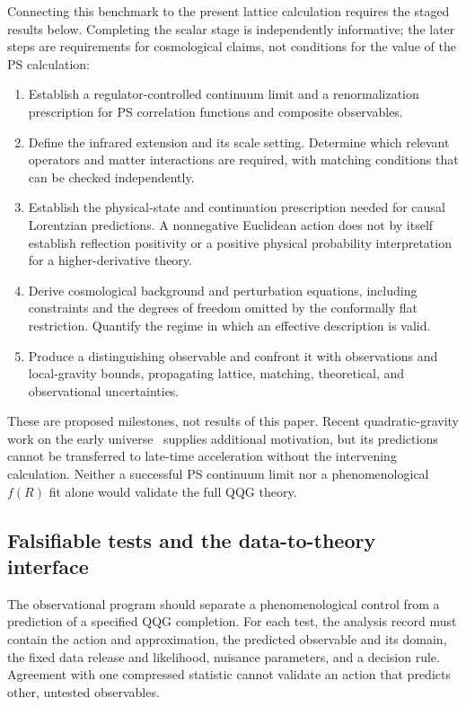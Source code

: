 Connecting this benchmark to the present lattice calculation requires the staged results below.  Completing the scalar stage is independently informative; the later steps are requirements for cosmological claims, not conditions for the value of the PS calculation:
\begin{enumerate}
 \item Establish a regulator-controlled continuum limit and a renormalization prescription for PS correlation functions and composite observables.
 \item Define the infrared extension and its scale setting.  Determine which relevant operators and matter interactions are required, with matching conditions that can be checked independently.
 \item Establish the physical-state and continuation prescription needed for causal Lorentzian predictions.  A nonnegative Euclidean action does not by itself establish reflection positivity or a positive physical probability interpretation for a higher-derivative theory.
 \item Derive cosmological background and perturbation equations, including constraints and the degrees of freedom omitted by the conformally flat restriction.  Quantify the regime in which an effective description is valid.
 \item Produce a distinguishing observable and confront it with observations and local-gravity bounds, propagating lattice, matching, theoretical, and observational uncertainties.
\end{enumerate}
These are proposed milestones, not results of this paper.  Recent quadratic-gravity work on the early universe~\cite{Liu:2026,Boyle:2026} supplies additional motivation, but its predictions cannot be transferred to late-time acceleration without the intervening calculation.  Neither a successful PS continuum limit nor a phenomenological $f(R)$ fit alone would validate the full QQG theory.

\subsection{Falsifiable tests and the data-to-theory interface}
\label{sec:observational-tests}

The observational program should separate a phenomenological control from a prediction of a specified QQG completion.  For each test, the analysis record must contain the action and approximation, the predicted observable and its domain, the fixed data release and likelihood, nuisance parameters, and a decision rule.  Agreement with one compressed statistic cannot validate an action that predicts other, untested observables.

